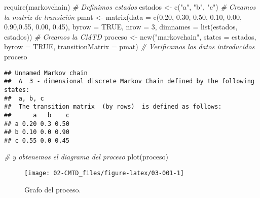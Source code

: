 \documentclass[
]{book}
\newenvironment{Shaded}{\begin{snugshade}}{\end{snugshade}}
\newcommand{\AttributeTok}[1]{\textcolor[rgb]{0.77,0.63,0.00}{#1}}
\newcommand{\CommentTok}[1]{\textcolor[rgb]{0.56,0.35,0.01}{\textit{#1}}}
\newcommand{\ConstantTok}[1]{\textcolor[rgb]{0.00,0.00,0.00}{#1}}
\newcommand{\DecValTok}[1]{\textcolor[rgb]{0.00,0.00,0.81}{#1}}
\newcommand{\FloatTok}[1]{\textcolor[rgb]{0.00,0.00,0.81}{#1}}
\newcommand{\FunctionTok}[1]{\textcolor[rgb]{0.00,0.00,0.00}{#1}}
\newcommand{\NormalTok}[1]{#1}
\newcommand{\OtherTok}[1]{\textcolor[rgb]{0.56,0.35,0.01}{#1}}
\newcommand{\StringTok}[1]{\textcolor[rgb]{0.31,0.60,0.02}{#1}}
\theoremstyle{definition}
\theoremstyle{definition}
\theoremstyle{definition}
\theoremstyle{definition}
\theoremstyle{remark}
\begin{document}
\begin{Shaded}
\begin{Highlighting}[]
\FunctionTok{require}\NormalTok{(markovchain)}
\CommentTok{\# Definimos estados}
\NormalTok{estados }\OtherTok{\textless{}{-}} \FunctionTok{c}\NormalTok{(}\StringTok{"a"}\NormalTok{, }\StringTok{"b"}\NormalTok{, }\StringTok{"c"}\NormalTok{)}
\CommentTok{\# Creamos la matriz de transición }
\NormalTok{pmat }\OtherTok{\textless{}{-}} \FunctionTok{matrix}\NormalTok{(}\AttributeTok{data =} \FunctionTok{c}\NormalTok{(}\FloatTok{0.20}\NormalTok{, }\FloatTok{0.30}\NormalTok{, }\FloatTok{0.50}\NormalTok{, }\FloatTok{0.10}\NormalTok{, }\FloatTok{0.00}\NormalTok{, }\FloatTok{0.90}\NormalTok{,}\FloatTok{0.55}\NormalTok{, }\FloatTok{0.00}\NormalTok{, }\FloatTok{0.45}\NormalTok{), }
               \AttributeTok{byrow =} \ConstantTok{TRUE}\NormalTok{, }\AttributeTok{nrow =} \DecValTok{3}\NormalTok{, }
               \AttributeTok{dimnames =} \FunctionTok{list}\NormalTok{(estados, estados))}
\CommentTok{\# Creamos la CMTD}
\NormalTok{proceso }\OtherTok{\textless{}{-}} \FunctionTok{new}\NormalTok{(}\StringTok{"markovchain"}\NormalTok{, }\AttributeTok{states =}\NormalTok{ estados, }
               \AttributeTok{byrow =} \ConstantTok{TRUE}\NormalTok{, }\AttributeTok{transitionMatrix =}\NormalTok{ pmat)}
\CommentTok{\# Verificamos los datos introducidos}
\NormalTok{proceso}
\end{Highlighting}
\end{Shaded}

\begin{verbatim}
## Unnamed Markov chain 
##  A  3 - dimensional discrete Markov Chain defined by the following states: 
##  a, b, c 
##  The transition matrix  (by rows)  is defined as follows: 
##      a   b    c
## a 0.20 0.3 0.50
## b 0.10 0.0 0.90
## c 0.55 0.0 0.45
\end{verbatim}

\begin{Shaded}
\begin{Highlighting}[]
\CommentTok{\# y obtenemos el diagrama del proceso}
\FunctionTok{plot}\NormalTok{(proceso)}
\end{Highlighting}
\end{Shaded}

\begin{figure}

{\centering \texttt{[image: 02-CMTD\_files/figure-latex/03-001-1]} 

}

\caption{Grafo del proceso.}\label{fig:03-001}
\end{figure}
\end{document}
